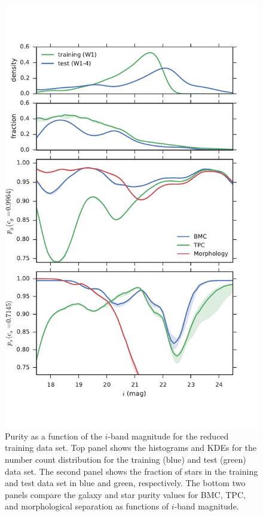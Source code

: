 \documentclass[useAMS,usenatbib]{mn2e}
\begin{document}
\begin{figure}
  \centering
  \includegraphics[width=\columnwidth]{figures/purity_mag_cut.pdf}
  \caption{Purity as a function of the $i$-band magnitude
           for the reduced training data set.
           Top panel shows the histograms and KDEs
           for the number count distribution for
           the training (blue) and test (green) data set.
           The second panel shows the fraction of stars
           in the training and test data set in blue and green, respectively.
           The bottom two panels compare
           the galaxy and star purity values for BMC, TPC, 
           and morphological separation as functions of $i$-band magnitude.}
  \label{fig:purity_mag_cut}
\end{figure}
\end{document}
